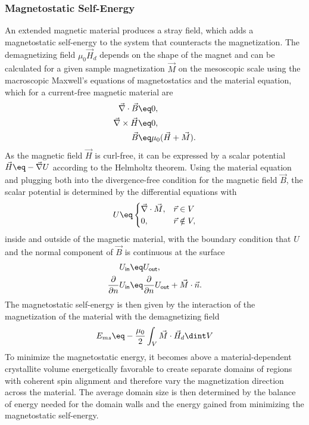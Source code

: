 \documentclass[\main/dresen_thesis.tex]{subfiles}
\begin{document}
      \subsubsection{Magnetostatic Self-Energy}
        An extended magnetic material produces a stray field, which adds a magnetostatic self-energy to the system that counteracts the magnetization.
        The demagnetizing field $\mu_0 \vec{H}_d$ depends on the shape of the magnet and can be calculated for a given sample magnetization $\vec{M}$ on the mesoscopic scale using the macroscopic Maxwell's equations of magnetostatics and the material equation, which for a current-free magnetic material are \cite{Jackson_1999_Class}
        \begin{align}
          \vec{\nabla} \cdot \vec{B} \eq& 0,\\
          \vec{\nabla} \times \vec{H} \eq& 0,\\
          \vec{B} \eq& \mu_0 (\vec{H} + \vec{M}).
        \end{align}
        As the magnetic field $\vec{H}$ is curl-free, it can be expressed by a scalar potential $\vec{H} \eq -\vec{\nabla} U$ according to the Helmholtz theorem.
        Using the material equation and plugging both into the divergence-free condition for the magnetic field $\vec{B}$, the scalar potential is determined by the differential equations with
        \begin{align}
          U \eq \begin{cases}
            \vec{\nabla} \cdot \vec{M}, & \vec{r} \in V \\
            0, &\vec{r} \notin V,
        \end{cases}
        \end{align}
        inside and outside of the magnetic material, with the boundary condition that $U$ and the normal component of $\vec{B}$ is continuous at the surface
        \begin{align}
          U_\mathsf{in} &\eq U_\mathsf{out},\\
          \frac{\partial}{\partial n} U_\mathsf{in} &\eq \frac{\partial}{\partial n} U_\mathsf{out} + \vec{M} \cdot \vec{n}.\\
        \end{align}
        The magnetostatic self-energy is then given by the interaction of the magnetization of the material with the demagnetizing field
        \begin{align}
          E_{ms} \eq -\frac{\mu_0}{2} \int_V \vec{M} \cdot \vec{H}_d \dint V
        \end{align}
        To minimize the magnetostatic energy, it becomes above a material-dependent crystallite volume energetically favorable to create separate domains of regions with coherent spin alignment and therefore vary the magnetization direction across the material.
        The average domain size is then determined by the balance of energy needed for the domain walls and the energy gained from minimizing the magnetostatic self-energy.
        \\
\end{document}
